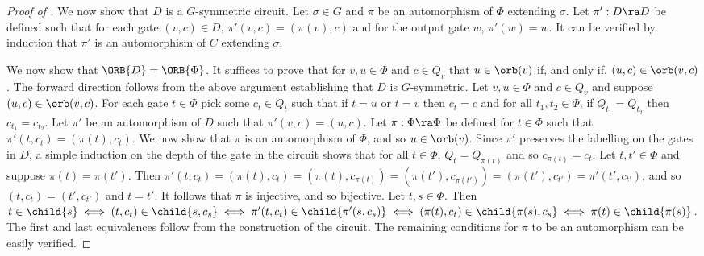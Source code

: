 \documentclass{toc}
\begin{document}
\begin{proof}[Proof of ]
  We now show that $D$ is a $G$-symmetric circuit. Let $\sigma \in G$ and $\pi$
  be an automorphism of $\Phi$ extending $\sigma$. Let $\pi' : D \ra D$ be
  defined such that for each gate $(v, c) \in D$, $\pi' (v, c) = (\pi(v), c)$
  and for the output gate $w$, $\pi'(w) = w$. It can be verified by induction
  that $\pi'$ is an automorphism of $C$ extending $\sigma$.
  
  We now show that $\ORB{D} = \ORB{\Phi}$. It suffices to prove that for $v, u
  \in \Phi$ and $c \in Q_v$ that $u \in \orb(v)$ if, and only if, $(u, c) \in
  \orb(v, c)$. The forward direction follows from the above argument
  establishing that $D$ is $G$-symmetric. Let $v, u \in \Phi$ and $c \in Q_v$
  and suppose $(u, c) \in \orb(v, c)$. For each gate $t \in \Phi$ pick some $c_t
  \in Q_t$ such that if $t = u$ or $t = v$ then $c_t = c$ and for all $t_1, t_2
  \in \Phi$, if $Q_{t_1} = Q_{t_2}$ then $c_{t_1} = c_{t_2}$. Let $\pi'$ be an
  automorphism of $D$ such that $\pi'(v, c) = (u, c)$. Let $\pi : \Phi \ra \Phi$
  be defined for $t \in \Phi$ such that $\pi' (t, c_t) = (\pi(t), c_t)$. We now
  show that $\pi$ is an automorphism of $\Phi$, and so $u \in
  \orb(v)$. Since $\pi'$ preserves the labelling on the gates in $D$,
  a simple induction on the depth of the gate in the circuit shows 
  that for all $t \in \Phi$, $Q_{t} = Q_{\pi(t)}$ and so $c_{\pi(t)} = c_t$. Let
  $t, t' \in \Phi$ and suppose $\pi(t) = \pi (t')$. Then $\pi'(t, c_t) =
  (\pi(t), c_t) = (\pi(t), c_{\pi(t)}) = (\pi(t'), c_{\pi(t')}) = (\pi(t'),
  c_{t'}) = \pi'(t', c_{t'})$, and so $(t, c_t) = (t', c_{t'})$ and $t = t'$. It
  follows that $\pi$ is injective, and so bijective. Let $t, s \in \Phi$. Then
  $t \in \child{s} \iff (t, c_t) \in \child{s, c_s} \iff \pi'(t, c_t) \in
  \child{\pi'(s, c_s)} \iff (\pi(t), c_t) \in \child{\pi(s), c_s} \iff \pi(t)
  \in \child{\pi(s)}$. The first and last equivalences follow from the
  construction of the circuit. The remaining conditions for $\pi$ to be an
  automorphism can be easily verified.


\end{proof}
\end{document}
